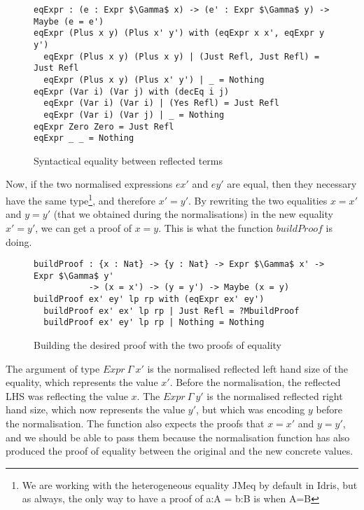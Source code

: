 \begin{figure}[H]
\figrule
\begin{center}
\begin{lstlisting}
eqExpr : (e : Expr $\Gamma$ x) -> (e' : Expr $\Gamma$ y) -> Maybe (e = e')
eqExpr (Plus x y) (Plus x' y') with (eqExpr x x', eqExpr y y')
  eqExpr (Plus x y) (Plus x y) | (Just Refl, Just Refl) = Just Refl
  eqExpr (Plus x y) (Plus x' y') | _ = Nothing
eqExpr (Var i) (Var j) with (decEq i j)
  eqExpr (Var i) (Var i) | (Yes Refl) = Just Refl
  eqExpr (Var i) (Var j) | _ = Nothing
eqExpr Zero Zero = Just Refl
eqExpr _ _ = Nothing
\end{lstlisting}
\end{center}
\caption{Syntactical equality between reflected terms}
\figrule
\end{figure}


Now, if the two normalised expressions $ex'$ and $ey'$ are equal, then they necessary have the same type\footnote{We are working with the heterogeneous equality JMeq by default in Idris, but as always, the only way to have a proof of a:A = b:B is when A=B}, and therefore $x'=y'$.
By rewriting the two equalities $x=x'$ and $y=y'$ (that we obtained during the normalisations) in the new equality $x'=y'$, we can get a proof of $x=y$. This is what the function $buildProof$ is doing.

\begin{figure}[H]
\figrule
\begin{center}
\begin{lstlisting}
buildProof : {x : Nat} -> {y : Nat} -> Expr $\Gamma$ x' -> Expr $\Gamma$ y' 
           -> (x = x') -> (y = y') -> Maybe (x = y)
buildProof ex' ey' lp rp with (eqExpr ex' ey')
  buildProof ex' ex' lp rp | Just Refl = ?MbuildProof
  buildProof ex' ey' lp rp | Nothing = Nothing
\end{lstlisting}
\end{center}
\caption{Building the desired proof with the two proofs of equality}
\figrule
\end{figure}

The argument of type $Expr\ \Gamma\ x'$ is the normalised reflected left hand size of the equality, which represents the value $x'$. Before the normalisation, the reflected LHS was reflecting the value $x$. The $Expr\ \Gamma\ y'$ is the normalised reflected right hand size, which now represents the value $y'$, but which was encoding $y$ before the normalisation. The function also expects the proofs that $x=x'$ and $y=y'$, and we should be able to pass them because the normalisation function has also produced the proof of equality between the original and the new concrete values.

